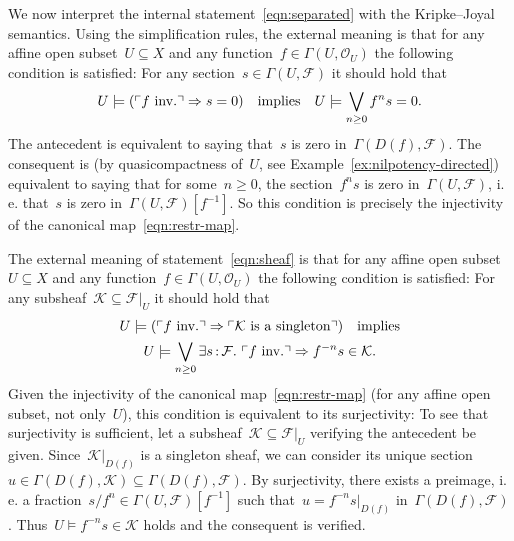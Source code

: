 \documentclass[10pt,reqno,a4paper]{amsbook}
\makeatletter
\theoremstyle{definition}
\theoremstyle{plain}
\theoremstyle{remark}
\newcommand{\F}{\mathcal{F}}
\renewcommand{\O}{\mathcal{O}}
\newcommand{\K}{\mathcal{K}}
\newcommand{\?}{\,{:}\,}
\renewcommand{\_}{\mathpunct{.}\,}
\newcommand{\speak}[1]{\ulcorner\text{\textnormal{#1}}\urcorner}
\newcommand{\ie}{i.\,e.\@\xspace}
\newcommand{\inv}{inv.\@}
\renewenvironment{proof}[1][\proofname]{\par
  \pushQED{\qed}%
  \normalfont \topsep6\p@\@plus6\p@\relax
  \trivlist
  \item[\hskip\labelsep
        \itshape
    #1\@addpunct{.}]\ignorespaces
}{%
  \popQED\endtrivlist\@endpefalse
}
\makeatother
\begin{document}
\begin{proof}[Proof of Theorem~\ref{thm:qcoh-sheafchar}]
We now interpret the internal statement~\eqref{eqn:separated} with the
Kripke--Joyal semantics. Using the simplification rules, the external meaning
is that for any affine open subset~$U \subseteq X$ and any function~$f \in
\Gamma(U,\O_U)$ the following condition is satisfied: For any section~$s \in
\Gamma(U,\F)$ it should hold that
\[ U \models (\speak{$f$ \inv} \Rightarrow s = 0) \quad\text{implies}\quad
  U \models \bigvee_{n \geq 0} f^n s = 0. \]
The antecedent is equivalent to saying that~$s$ is zero in~$\Gamma(D(f),\F)$.
The consequent is (by quasicompactness of~$U$, see
Example~\ref{ex:nilpotency-directed}) equivalent to saying that for some~$n \geq 0$, the
section~$f^n s$ is zero in~$\Gamma(U,\F)$, \ie that~$s$ is zero
in~$\Gamma(U,\F)[f^{-1}]$. So this condition is precisely the injectivity of
the canonical map~\eqref{eqn:restr-map}.

The external meaning of statement~\eqref{eqn:sheaf} is that for any affine open
subset~$U \subseteq X$ and any function~$f \in \Gamma(U,\O_U)$ the following
condition is satisfied: For any subsheaf~$\K \subseteq \F|_U$ it should hold
that
\begin{multline*}
  U \models (\speak{$f$ \inv} \Rightarrow \speak{$\K$ is a singleton})
  \quad\text{implies} \\
  U \models \bigvee_{n \geq 0} \exists s\?\F\_
  \speak{$f$ \inv} \Rightarrow f^{-n} s \in \K.
\end{multline*}
Given the injectivity of the canonical map~\eqref{eqn:restr-map} (for any
affine open subset, not only~$U$), this condition is equivalent to its
surjectivity: To see that surjectivity is sufficient, let a subsheaf~$\K
\subseteq \F|_U$ verifying the antecedent be given. Since~$\K|_{D(f)}$ is a
singleton sheaf, we can consider its unique section~$u \in \Gamma(D(f),\K)
\subseteq \Gamma(D(f),\F)$. By surjectivity, there exists a preimage, \ie a
fraction~$s/f^n \in \Gamma(U,\F)[f^{-1}]$ such that~$u = f^{-n} s|_{D(f)}$
in~$\Gamma(D(f),\F)$. Thus~$U \models f^{-n}s \in \K$ holds and the consequent
is verified.


\end{proof}
\end{document}
